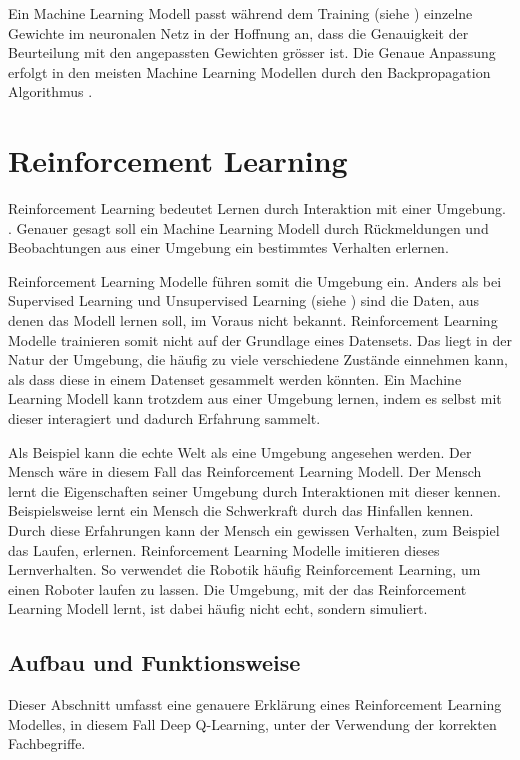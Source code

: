 Ein Machine Learning Modell passt während dem Training (siehe
) einzelne Gewichte im neuronalen Netz in der Hoffnung
an, dass die Genauigkeit der Beurteilung mit den angepassten Gewichten grösser
ist. Die Genaue Anpassung erfolgt in den meisten Machine Learning Modellen durch
den Backpropagation Algorithmus
\cite{ognjanovski_everything_2020}\cite{david_e_rumelhart_learning_nodate}.

\section{Reinforcement Learning}\label{chap:t_rl}
Reinforcement Learning bedeutet Lernen durch Interaktion mit einer Umgebung.
\cite{osinski_what_2018}. Genauer gesagt soll ein Machine Learning Modell durch
Rückmeldungen und Beobachtungen aus einer Umgebung ein bestimmtes Verhalten
erlernen.

Reinforcement Learning Modelle führen somit die Umgebung ein. Anders als bei
Supervised Learning und Unsupervised Learning (siehe ) sind
die Daten, aus denen das Modell lernen soll, im Voraus nicht bekannt.
Reinforcement Learning Modelle trainieren somit nicht auf der Grundlage eines
Datensets. Das liegt in der Natur der Umgebung, die häufig zu viele verschiedene
Zustände einnehmen kann, als dass diese in einem Datenset gesammelt werden
könnten. Ein Machine Learning Modell kann trotzdem aus einer Umgebung lernen,
indem es selbst mit dieser interagiert und dadurch Erfahrung sammelt.
\cite{piyush_verma_what_2021}

Als Beispiel kann die echte Welt als eine Umgebung angesehen werden. Der Mensch
wäre in diesem Fall das Reinforcement Learning Modell. Der Mensch lernt die
Eigenschaften seiner Umgebung durch Interaktionen mit dieser kennen.
Beispielsweise lernt ein Mensch die Schwerkraft durch das Hinfallen kennen.
Durch diese Erfahrungen kann der Mensch ein gewissen Verhalten, zum Beispiel das
Laufen, erlernen. Reinforcement Learning Modelle imitieren dieses Lernverhalten.
So verwendet die Robotik häufig Reinforcement Learning, um einen Roboter laufen
zu lassen. Die Umgebung, mit der das Reinforcement Learning Modell lernt, ist
dabei häufig nicht echt, sondern simuliert.

\subsection{Aufbau und Funktionsweise}\label{sub:t_rl_func}
Dieser Abschnitt umfasst eine genauere Erklärung eines Reinforcement Learning
Modelles, in diesem Fall Deep Q-Learning, unter der Verwendung der korrekten
Fachbegriffe.

